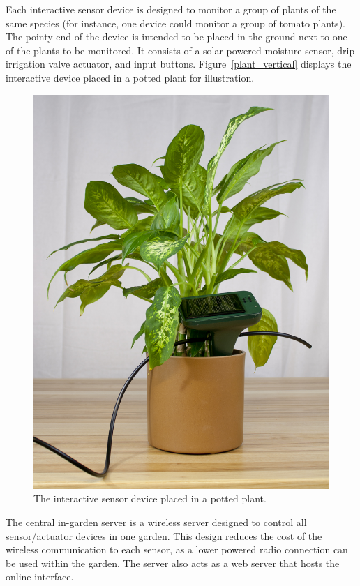 \documentclass[11pt]{article}
\begin{document}
Each interactive sensor device is designed to monitor a group of plants of the same species (for instance, one device could monitor a group of tomato plants). The pointy end of the device is intended to be placed in the ground next to one of the plants to be monitored. It consists of a solar-powered moisture sensor, drip irrigation valve actuator, and input buttons. Figure~\ref{plant_vertical} displays the interactive device placed in a potted plant for illustration.

\begin{figure}[h]
\begin{center}
\includegraphics[scale=0.15]{./pngs/plant_vertical.jpg}
\end{center}
\caption{The interactive sensor device placed in a potted plant.}
\label{fig:plant_vertical}
\end{figure}

The central in-garden server is a wireless server designed to control all sensor/actuator devices in one garden. This design reduces the cost of the wireless communication to each sensor, as a lower powered radio connection can be used within the garden. The server also acts as a web server that hosts the online interface.
\end{document}
